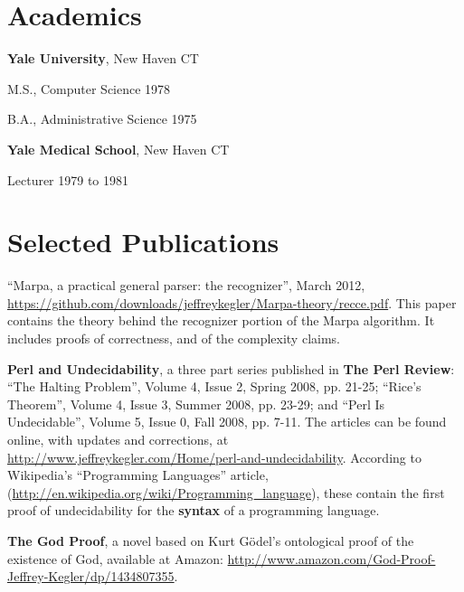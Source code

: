 \documentclass[12pt,margin,line]{res}
\newcommand{\internalskip}{\vspace{-.15in}}
\newenvironment{mylist}{
  \begin{list}{}
  {%
      \setlength{\itemsep}{0in}%
      \setlength{\leftmargin}{0.2in}%
      \setlength{\parsep}{0in}%
      \setlength{\parskip}{0in}%
      \setlength{\partopsep}{0in}%
      \setlength{\topsep}{0in}%
  }
}
{\end{list}}
\begin{document}
\address{\url{http:://www.jeffreykegler.com/}}

\begin{resume}

\section{\sc Academics}
{\bf Yale University}, New Haven CT
\begin{mylist}
\item[] M.S., Computer Science \hfill  1978
\item[] B.A., Administrative Science \hfill  1975
\end{mylist}

\internalskip
{\bf Yale Medical School}, New Haven CT
\begin{mylist}
\item[] Lecturer \hfill 1979 to 1981\\
\end{mylist}
\vspace{-.2in}

\section{\sc Selected Publications}

``Marpa, a practical general parser: the recognizer'',
March 2012,
\url{https://github.com/downloads/jeffreykegler/Marpa-theory/recce.pdf}.
This paper contains the theory behind the
recognizer portion of the
Marpa algorithm.
It includes proofs of correctness, and of the complexity claims.

{\bf Perl and Undecidability}, a three part series published
in {\bf The Perl Review}:
``The Halting Problem'', Volume 4, Issue 2, Spring 2008, pp. 21-25;
``Rice's Theorem'', Volume 4, Issue 3, Summer 2008, pp. 23-29; and
``Perl Is Undecidable'', Volume 5, Issue 0, Fall 2008, pp. 7-11.
The articles can be found online, with updates and corrections,
at \url{http://www.jeffreykegler.com/Home/perl-and-undecidability}.
According to Wikipedia's ``Programming Languages'' article,
(\url{http://en.wikipedia.org/wiki/Programming_language}),
these contain the first proof of undecidability for the {\bf syntax}
of a programming language.

{\bf The God Proof},
a novel based on Kurt G\"{o}del's
ontological proof of the existence
of God,
available at Amazon:
\url{http://www.amazon.com/God-Proof-Jeffrey-Kegler/dp/1434807355}.


\end{resume}
\end{document}
